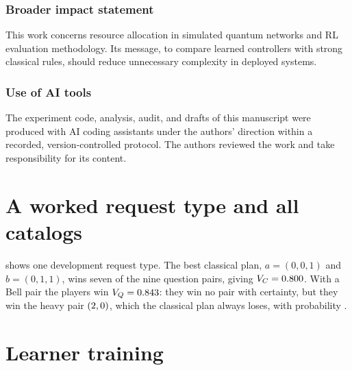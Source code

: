 \documentclass[10pt]{article}
\begin{document}
\subsubsection*{Broader impact statement}
This work concerns resource allocation in simulated quantum networks and RL evaluation methodology. Its message, to compare learned controllers with strong classical rules, should reduce unnecessary complexity in deployed systems.

\subsubsection*{Use of AI tools}
The experiment code, analysis, audit, and drafts of this manuscript were produced with AI coding assistants under the authors' direction within a recorded, version-controlled protocol. The authors reviewed the work and take responsibility for its content.




\appendix

\section{A worked request type and all catalogs}\label{app:xor}

 shows one development request type. The best classical plan, $a=(0,0,1)$ and $b=(0,1,1)$, wins seven of the nine question pairs, giving $V_C=0.800$. With a Bell pair the players win $V_Q=0.843$: they win no pair with certainty, but they win the heavy pair $(2,0)$, which the classical plan always loses, with probability \xorRecQ.

\begin{table}[H]
\centering\small
\caption{Request type \texttt{qip-development-type-000}, one row per question pair.}
\label{tab:xor}

\end{table}

\begin{table}[H]
\centering\small
\caption{All catalogs. ``Stay'' and ``Next'' are mean probabilities of staying in the same state and of moving to the next state in the generator's cycle. }

\end{table}

\section{Learner training}\label{app:training}
\end{document}
